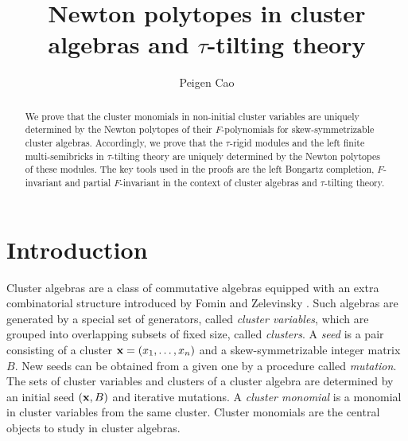 \documentclass[10pt]{amsart}
\theoremstyle{definition}
\theoremstyle{remark}
\numberwithin{equation}{section}
\begin{document}
\title[Newton polytopes in cluster algebras and $\tau$-tilting theory]{Newton polytopes in cluster algebras and $\tau$-tilting theory}




\author{Peigen Cao}
\address{School of Mathematical Sciences, University of Science and Technology of China, Hefei, 230026, People's Republic of China
}






\dedicatory{}



\date{}


\keywords{}


\begin{abstract}
We prove that the cluster monomials in non-initial cluster variables are uniquely determined by the Newton polytopes of their $F$-polynomials for  skew-symmetrizable cluster algebras. Accordingly, we prove that the $\tau$-rigid modules and the left finite multi-semibricks in $\tau$-tilting theory are uniquely determined by the Newton polytopes of these modules. The key tools used in the proofs are the left Bongartz completion, $F$-invariant and partial $F$-invariant in the context of cluster algebras and $\tau$-tilting theory.
\end{abstract}

\maketitle


\tableofcontents




\section{Introduction}
Cluster algebras are a class of commutative algebras equipped with an extra combinatorial structure introduced by Fomin and Zelevinsky \cite{fz_2002}. Such algebras are  generated by a special set of
generators, called {\em cluster variables}, which are grouped into overlapping subsets of fixed size,
called {\em clusters}. A {\em seed} is a pair consisting of a cluster ${\bf x}=(x_1,\ldots,x_n)$ and a skew-symmetrizable integer matrix $B$.  New seeds can be obtained from a given one by a procedure called {\em mutation}.
The sets of cluster variables and clusters of a cluster algebra are determined by an initial seed $({\bf x}, B)$ and iterative mutations.
A {\em cluster monomial} is a monomial in cluster variables from the same cluster. Cluster monomials are the central objects to study in cluster algebras.
\end{document}
